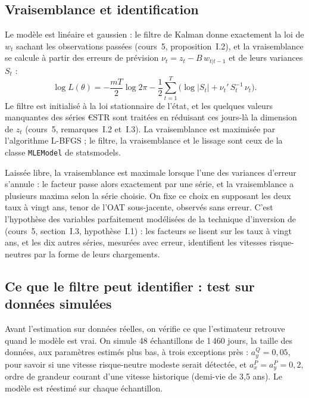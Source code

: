 \subsection{Vraisemblance et identification}

Le modèle est linéaire et gaussien : le filtre de Kalman donne exactement la loi de $w_t$ sachant les observations
passées (cours~5, proposition~I.2), et la vraisemblance se calcule à partir des erreurs de prévision
$\nu_t = z_t - B\,w_{t|t-1}$ et de leurs variances $S_t$ :
\begin{equation}
\log L(\theta) = -\frac{mT}{2}\log 2\pi - \frac12\sum_{t=1}^T\Big(\log|S_t| + \nu_t'\,S_t^{-1}\,\nu_t\Big).
\end{equation}
Le filtre est initialisé à la loi stationnaire de l'état, et les quelques valeurs manquantes des séries €STR sont
traitées en réduisant ces jours-là la dimension de $z_t$ (cours~5, remarques~I.2 et~I.3). La vraisemblance est
maximisée par l'algorithme L-BFGS ; le filtre, la vraisemblance et le lissage sont ceux de la classe
\texttt{MLEModel} de statsmodels.

Laissée libre, la vraisemblance est maximale lorsque l'une des variances d'erreur s'annule : le facteur passe alors
exactement par une série, et la vraisemblance a plusieurs maxima selon la série choisie. On fixe ce choix en
supposant les deux taux à vingt ans, tenor de l'OAT sous-jacente, observés sans erreur. C'est l'hypothèse des
variables parfaitement modélisées de la technique d'inversion de \citet{ChenScott1993}
(cours~5, section~I.3, hypothèse~I.1) : les facteurs se lisent sur les taux à vingt ans, et les dix autres séries,
mesurées avec erreur, identifient les vitesses risque-neutres par la forme de leurs chargements.

\subsection{Ce que le filtre peut identifier : test sur données simulées}

Avant l'estimation sur données réelles, on vérifie ce que l'estimateur retrouve quand le modèle est vrai. On simule
48 échantillons de 1\,460 jours, la taille des données, aux paramètres estimés plus bas, à trois exceptions près :
$a_y^Q = 0{,}05$, pour savoir si une vitesse risque-neutre modeste serait détectée, et $a_x^P = a_y^P = 0{,}2$,
ordre de grandeur courant d'une vitesse historique (demi-vie de 3,5 ans). Le modèle est réestimé sur chaque
échantillon.

